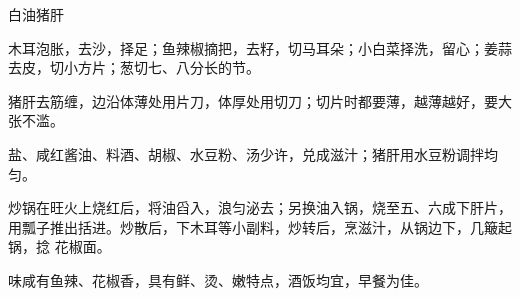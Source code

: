 \begin{recipe}{白油猪肝}

\ingredients


\preparation

\step 木耳泡胀，去沙，择足；鱼辣椒摘把，去籽，切马耳朵；小白菜择洗，留心；姜蒜
去皮，切小方片；葱切七、八分长的节。

\step 猪肝去筋缠，边沿体薄处用片刀，体厚处用切刀；切片时都要薄，越薄越好，要大
张不滥。

\step 盐、咸红酱油、料酒、胡椒、水豆粉、汤少许，兑成滋汁；猪肝用水豆粉调拌均匀。

\step 炒锅在旺火上烧红后，将油舀入，浪匀泌去；另换油入锅，烧至五、六成下肝片，
用瓢子推出括进。炒散后，下木耳等小副料，炒转后，烹滋汁，从锅边下，几簸起锅，捻
花椒面。

\features

味咸有鱼辣、花椒香，具有鲜、烫、嫩特点，酒饭均宜，早餐为佳。

\end{recipe}

